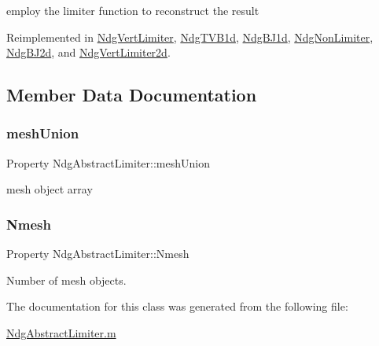 employ the limiter function to reconstruct the result 



Reimplemented in \hyperlink{class_ndg_vert_limiter_ac46cd8aff2658389eb62d813a8861d43}{Ndg\+Vert\+Limiter}, \hyperlink{class_ndg_t_v_b1d_a40ad2156347517a9258c709d25073180}{Ndg\+T\+V\+B1d}, \hyperlink{class_ndg_b_j1d_a913e385cd4c535f6dd7fcfbb7594e421}{Ndg\+B\+J1d}, \hyperlink{class_ndg_non_limiter_a05c9175b9f4723c7f12d1db14a2f50a9}{Ndg\+Non\+Limiter}, \hyperlink{class_ndg_b_j2d_a9483f2ee7676a72c59325d0c50005ec3}{Ndg\+B\+J2d}, and \hyperlink{class_ndg_vert_limiter2d_a26be61b8865340e1480ace3abb582d73}{Ndg\+Vert\+Limiter2d}.



\subsection{Member Data Documentation}
\mbox{\label{class_ndg_abstract_limiter_abf2440c93b82a32bb9702a143b688ef2}} 
\subsubsection{\texorpdfstring{mesh\+Union}{meshUnion}}
{\footnotesize\ttfamily Property Ndg\+Abstract\+Limiter\+::mesh\+Union\hspace{0.3cm}{\ttfamily [protected]}}



mesh object array 

\mbox{\label{class_ndg_abstract_limiter_a3209227fdbccea468f4c1e43649de9e0}} 
\subsubsection{\texorpdfstring{Nmesh}{Nmesh}}
{\footnotesize\ttfamily Property Ndg\+Abstract\+Limiter\+::\+Nmesh\hspace{0.3cm}{\ttfamily [protected]}}



Number of mesh objects. 



The documentation for this class was generated from the following file\+:\begin{DoxyCompactItemize}
\item 
\hyperlink{_ndg_abstract_limiter_8m}{Ndg\+Abstract\+Limiter.\+m}\end{DoxyCompactItemize}
